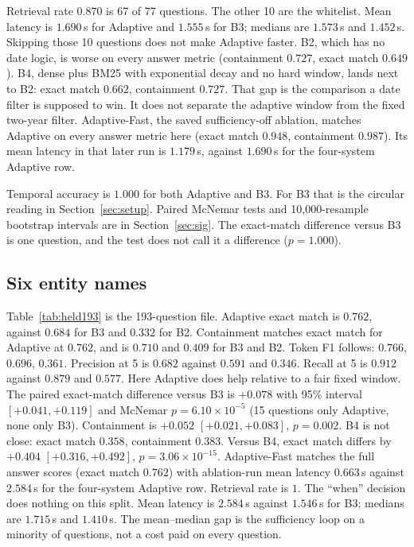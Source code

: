 \documentclass[11pt]{article}
\begin{document}
Retrieval rate $0.870$ is 67 of 77 questions.
The other 10 are the whitelist.
Mean latency is $1.690$\,s for Adaptive and $1.555$\,s for B3; medians are $1.573$\,s and $1.452$\,s.
Skipping those 10 questions does not make Adaptive faster.
B2, which has no date logic, is worse on every answer metric (containment $0.727$, exact match $0.649$).
B4, dense plus BM25 with exponential decay and no hard window, lands next to B2: exact match $0.662$, containment $0.727$.
That gap is the comparison a date filter is supposed to win.
It does not separate the adaptive window from the fixed two-year filter.
Adaptive-Fast, the saved sufficiency-off ablation, matches Adaptive on every answer metric here (exact match $0.948$, containment $0.987$).
Its mean latency in that later run is $1.179$\,s, against $1.690$\,s for the four-system Adaptive row.

Temporal accuracy is $1.000$ for both Adaptive and B3.
For B3 that is the circular reading in Section~\ref{sec:setup}.
Paired McNemar tests and 10{,}000-resample bootstrap intervals are in Section~\ref{sec:sig}.
The exact-match difference versus B3 is one question, and the test does not call it a difference ($p=1.000$).

\subsection{Six entity names}

Table~\ref{tab:held193} is the 193-question file.
Adaptive exact match is $0.762$, against $0.684$ for B3 and $0.332$ for B2.
Containment matches exact match for Adaptive at $0.762$, and is $0.710$ and $0.409$ for B3 and B2.
Token F1 follows: $0.766$, $0.696$, $0.361$.
Precision at 5 is $0.682$ against $0.591$ and $0.346$.
Recall at 5 is $0.912$ against $0.879$ and $0.577$.
Here Adaptive does help relative to a fair fixed window.
The paired exact-match difference versus B3 is $+0.078$ with 95\% interval $[+0.041, +0.119]$ and McNemar $p=6.10\times 10^{-5}$ (15 questions only Adaptive, none only B3).
Containment is $+0.052$ $[+0.021, +0.083]$, $p=0.002$.
B4 is not close: exact match $0.358$, containment $0.383$.
Versus B4, exact match differs by $+0.404$ $[+0.316, +0.492]$, $p=3.06\times 10^{-15}$.
Adaptive-Fast matches the full answer scores (exact match $0.762$) with ablation-run mean latency $0.663$\,s against $2.584$\,s for the four-system Adaptive row.
Retrieval rate is $1$.
The ``when'' decision does nothing on this split.
Mean latency is $2.584$\,s against $1.546$\,s for B3; medians are $1.715$\,s and $1.410$\,s.
The mean--median gap is the sufficiency loop on a minority of questions, not a cost paid on every question.
\end{document}
